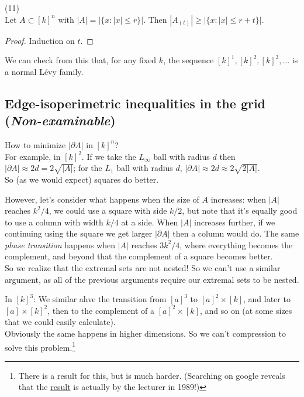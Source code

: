 \documentclass[a4paper]{article}
\begin{document}
\begin{coro} (11)\\
    Let $A \subset [k]^n$ with $|A| = |\{x:|x| \leq r\}|$. Then $|A_{(t)}| \geq |\{x:|x| \leq r+t\}|$.\\
    \begin{proof}
        Induction on $t$.
    \end{proof}
\end{coro}

\begin{rem}
    We can check from this that, for any fixed $k$, the sequence $[k]^1,[k]^2,[k]^3,...$ is a normal L\'evy family.
\end{rem}

\subsection{Edge-isoperimetric inequalities in the grid (\emph{Non-examinable})}

How to minimize $|\partial A|$ in $[k]^n$?\\
For example, in $[k]^2$. If we take the $L_\infty$ ball with radius $d$ then $|\partial A| \approx 2d = 2\sqrt{|A|}$; for the $L_1$ ball with radius $d$, $|\partial A| \approx 2d \approx 2\sqrt{2|A|}$.\\
So (as we would expect) squares do better.

However, let's consider what happens when the size of $A$ increases: when $|A|$ reaches $k^2/4$, we could use a square with side $k/2$, but note that it's equally good to use a column with width $k/4$ at a side. When $|A|$ increases further, if we continuing using the square we get larger $|\partial A|$ then a column would do. The same \emph{phase transition} happens when $|A|$ reaches $3k^2/4$, where everything becomes the complement, and beyond that the complement of a square becomes better.\\
So we realize that the extremal sets are not nested! So we can't use a similar argument, as all of the previous arguments require our extremal sets to be nested.

In $[k]^3$: We similar ahve the transition from $[a]^3$ to $[a]^2 \times [k]$, and later to $[a] \times [k]^2$, then to the complement of a $[a]^2 \times [k]$, and so on (at some sizes that we could easily calculate).\\
Obviously the same happens in higher dimensions. So we can't compression to solve this problem.\footnote{There is a result for this, but is much harder. (Searching on google reveals that the \href{https://link.springer.com/content/pdf/10.1007/BF01275667.pdf}{result} is actually by the lecturer in 1989!)}
\end{document}
